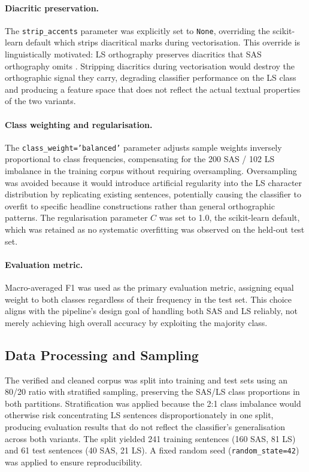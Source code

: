 \documentclass[11pt,a4paper]{article}
\begin{document}
\paragraph{Diacritic preservation.}
The \texttt{strip\_accents} parameter was explicitly set to
\texttt{None}, overriding the scikit-learn default which strips
diacritical marks during vectorisation. This override is
linguistically motivated: LS orthography preserves diacritics
that SAS orthography omits \citep{matlosa2017sesotho}. Stripping
diacritics during vectorisation would destroy the orthographic
signal they carry, degrading classifier performance on the LS
class and producing a feature space that does not reflect the
actual textual properties of the two variants.

\paragraph{Class weighting and regularisation.}
The \texttt{class\_weight='balanced'} parameter adjusts sample
weights inversely proportional to class frequencies, compensating
for the 200 SAS / 102 LS imbalance in the training corpus without
requiring oversampling. Oversampling was avoided because it would
introduce artificial regularity into the LS character distribution
by replicating existing sentences, potentially causing the
classifier to overfit to specific headline constructions rather
than general orthographic patterns. The regularisation parameter
$C$ was set to 1.0, the scikit-learn default, which was retained
as no systematic overfitting was observed on the held-out test
set.

\paragraph{Evaluation metric.}
Macro-averaged F1 was used as the primary evaluation metric,
assigning equal weight to both classes regardless of their
frequency in the test set. This choice aligns with the pipeline's
design goal of handling both SAS and LS reliably, not merely
achieving high overall accuracy by exploiting the majority class.


\subsection{Data Processing and Sampling }

The verified and cleaned corpus was split into training and test
sets using an 80/20 ratio with stratified sampling, preserving the
SAS/LS class proportions in both partitions. Stratification was
applied because the 2:1 class imbalance would otherwise risk
concentrating LS sentences disproportionately in one split,
producing evaluation results that do not reflect the classifier's
generalisation across both variants. The split yielded 241 training
sentences (160 SAS, 81 LS) and 61 test sentences (40 SAS, 21 LS).
A fixed random seed (\texttt{random\_state=42}) was applied to
ensure reproducibility.
\end{document}
